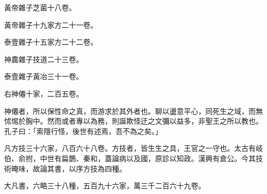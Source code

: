\begin{pinyinscope}
黃帝雜子芝菌十八卷。

黃帝雜子十九家方二十一卷。

泰壹雜子十五家方二十二卷。

神農雜子技道二十三卷。

泰壹雜子黃冶三十一卷。

右神僊十家，二百五卷。

神僊者，所以保性命之真，而游求於其外者也。聊以盪意平心，同死生之域，而無怵惕於胸中。然而或者專以為務，則誕欺怪迂之文彌以益多，非聖王之所以教也。孔子曰：「索隱行怪，後世有述焉，吾不為之矣。」

凡方技三十六家，八百六十八卷。方技者，皆生生之具，王官之一守也。太古有岐伯、俞拊，中世有扁鵲、秦和，蓋論病以及國，原診以知政。漢興有倉公。今其技術晻味，故論其書，以序方技為四種。

大凡書，六略三十八種，五百九十六家，萬三千二百六十九卷。


\end{pinyinscope}